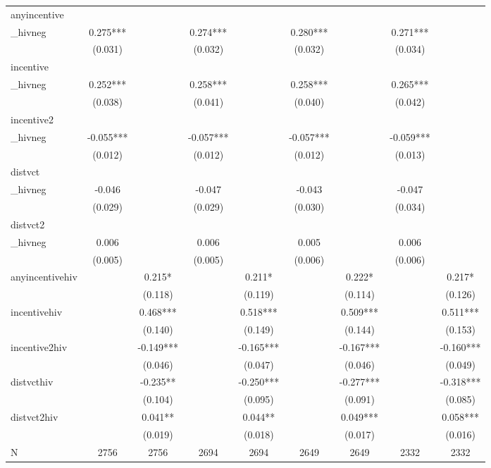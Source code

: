 \begin{tabular}{lcccccccc}
\hline
anyincentive\\_hivneg & 0.275*** &  & 0.274*** &  & 0.280*** &  & 0.271*** &  \\
 & (0.031) &  & (0.032) &  & (0.032) &  & (0.034) &  \\
incentive\\_hivneg & 0.252*** &  & 0.258*** &  & 0.258*** &  & 0.265*** &  \\
 & (0.038) &  & (0.041) &  & (0.040) &  & (0.042) &  \\
incentive2\\_hivneg & -0.055*** &  & -0.057*** &  & -0.057*** &  & -0.059*** &  \\
 & (0.012) &  & (0.012) &  & (0.012) &  & (0.013) &  \\
distvct\\_hivneg & -0.046 &  & -0.047 &  & -0.043 &  & -0.047 &  \\
 & (0.029) &  & (0.029) &  & (0.030) &  & (0.034) &  \\
distvct2\\_hivneg & 0.006 &  & 0.006 &  & 0.005 &  & 0.006 &  \\
 & (0.005) &  & (0.005) &  & (0.006) &  & (0.006) &  \\
anyincentivehiv &  & 0.215* &  & 0.211* &  & 0.222* &  & 0.217* \\
 &  & (0.118) &  & (0.119) &  & (0.114) &  & (0.126) \\
incentivehiv &  & 0.468*** &  & 0.518*** &  & 0.509*** &  & 0.511*** \\
 &  & (0.140) &  & (0.149) &  & (0.144) &  & (0.153) \\
incentive2hiv &  & -0.149*** &  & -0.165*** &  & -0.167*** &  & -0.160*** \\
 &  & (0.046) &  & (0.047) &  & (0.046) &  & (0.049) \\
distvcthiv &  & -0.235** &  & -0.250*** &  & -0.277*** &  & -0.318*** \\
 &  & (0.104) &  & (0.095) &  & (0.091) &  & (0.085) \\
distvct2hiv &  & 0.041** &  & 0.044** &  & 0.049*** &  & 0.058*** \\
 &  & (0.019) &  & (0.018) &  & (0.017) &  & (0.016) \\
\hline
N & 2756 & 2756 & 2694 & 2694 & 2649 & 2649 & 2332 & 2332 \\
\hline
\end{tabular}
